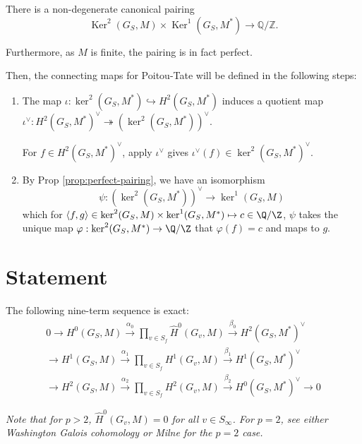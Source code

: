 \documentclass[11pt]{article}
\begin{document}
\begin{prop} \label{prop:perfect-pairing}
    There is a non-degenerate canonical pairing
    \[ \operatorname{Ker}^2(G_S,M)\times \operatorname{Ker}^1(G_S,M^*)\to \mathbb{Q}/\mathbb{Z}. \]

    \bigskip
    Furthermore, as $M$ is finite, the pairing is in fact perfect.
\end{prop}


\bigskip
Then, the connecting maps for Poitou-Tate will be defined in the following steps:
\begin{enumerate}
    \item The map $\iota: \ker^2 (G_S, M^*) \hookrightarrow H^2 (G_S, M^*)$ induces a quotient map $\iota^\vee: H^2 (G_S, M^*)^\vee \twoheadrightarrow (\ker^2 (G_S, M^*))^\vee.$

    \bigskip
    For $f \in H^2 (G_S, M^*)^\vee$, apply $\iota^\vee$ gives $\iota^\vee (f) \in \ker^2 (G_S, M^*)^\vee$.

    \item By Prop \ref{prop:perfect-pairing}, we have an isomorphism
    \[
    \psi: (\ker^2 (G_S, M^*))^\vee \to \ker^1 (G_S, M)
    \]
    which for $\langle f, g \rangle \in \ker^2 (G_S, M) \times \ker^1 (G_S, M^*) \mapsto c \in \Q/\Z$, $\psi$ takes the unique map $\varphi: \ker^2 (G_S, M^*) \to \Q/\Z$ that $\varphi(f) = c$ and maps to $g$.
\end{enumerate}




\section{Statement}
\begin{thm}
The following nine-term sequence is exact:
\begin{align*}
0 \to  H^0 (G_S, M) \xrightarrow{\alpha_0} \prod_{v \in S_f} \hat{H}^0 (G_v, M) \xrightarrow{\beta_0} H^2 (G_{S}, M^*)^\vee \\
\to  H^1 (G_S, M) \xrightarrow{\alpha_1} \prod_{v \in S_f} H^1 (G_v, M) \xrightarrow{\beta_1} H^1 (G_S, M^*)^\vee \\
\to H^2 (G_S, M) \xrightarrow{\alpha_2} \prod_{v \in S_f} H^2 (G_v, M) \xrightarrow{\beta_2} H^0 (G_S, M^*)^\vee \to 0
\end{align*}

\bigskip
\textit{Note that for $p >2$, $\widehat{H}^0 (G_{v}, M) = 0$ for all \( v\in S_\infty \). For $p = 2$, see either Washington Galois cohomology or Milne for the $p = 2$ case.}
\end{thm}
\end{document}

